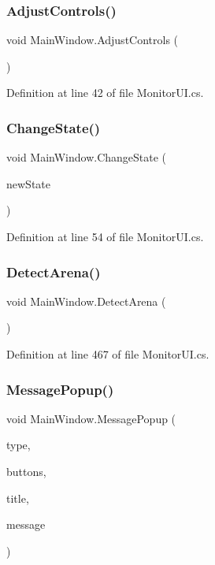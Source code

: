 \subsubsection{Adjust\+Controls()}
{\footnotesize\ttfamily void Main\+Window.\+Adjust\+Controls (\begin{DoxyParamCaption}{ }\end{DoxyParamCaption})}



Definition at line 42 of file Monitor\+U\+I.\+cs.

\mbox{\label{class_main_window_aedc27cabbe1604313a452fcbf3ffe9f4}} 
\subsubsection{Change\+State()}
{\footnotesize\ttfamily void Main\+Window.\+Change\+State (\begin{DoxyParamCaption}\item[{\textbf{ System\+State}}]{new\+State }\end{DoxyParamCaption})\hspace{0.3cm}{\ttfamily [private]}}



Definition at line 54 of file Monitor\+U\+I.\+cs.

\mbox{\label{class_main_window_a89c79ce9ca4114ca9c50f32dc080e9cd}} 
\subsubsection{Detect\+Arena()}
{\footnotesize\ttfamily void Main\+Window.\+Detect\+Arena (\begin{DoxyParamCaption}{ }\end{DoxyParamCaption})\hspace{0.3cm}{\ttfamily [protected]}}



Definition at line 467 of file Monitor\+U\+I.\+cs.

\mbox{\label{class_main_window_afc4f923aaa481a93dddaff6303efb9e0}} 
\subsubsection{Message\+Popup()}
{\footnotesize\ttfamily void Main\+Window.\+Message\+Popup (\begin{DoxyParamCaption}\item[{Message\+Type}]{type,  }\item[{Buttons\+Type}]{buttons,  }\item[{string}]{title,  }\item[{string}]{message }\end{DoxyParamCaption})\hspace{0.3cm}{\ttfamily [private]}}



